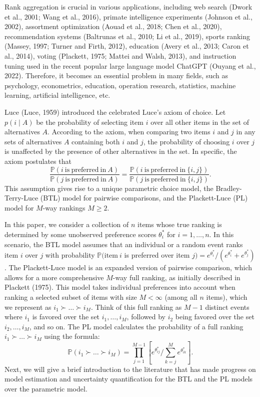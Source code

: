 Rank aggregation is crucial in various applications, including web search (Dwork et al., 2001; Wang et al., 2016), primate intelligence experiments (Johnson et al., 2002), assortment optimization (Aouad et al., 2018; Chen et al., 2020), recommendation systems (Baltrunas et al., 2010; Li et al., 2019), sports ranking (Massey, 1997; Turner and Firth, 2012), education (Avery et al., 2013; Caron et al., 2014), voting (Plackett, 1975; Mattei and Walsh, 2013), and instruction tuning used in the recent popular large language model ChatGPT (Ouyang et al., 2022). Therefore, it becomes an essential problem in many fields, such as psychology, econometrics, education, operation research, statistics, machine learning, artificial intelligence, etc.

Luce (Luce, 1959) introduced the celebrated Luce's axiom of choice. Let \(p(i\mid A)\) be the probability of selecting item \(i\) over all other items in the set of alternatives \(A\). According to the axiom, when comparing two items \(i\) and \(j\) in any sets of alternatives \(A\) containing both \(i\) and \(j\), the probability of choosing \(i\) over \(j\) is unaffected by the presence of other alternatives in the set. In specific, the axiom postulates that
\[
\frac{\mathbb{P}(i\mathrm{~is~preferred~in~}A)}{\mathbb{P}(j\mathrm{~is~preferred~in~}A)} = \frac{\mathbb{P}(i\mathrm{~is~preferred~in~}\{i,j\})}{\mathbb{P}(j\mathrm{~is~preferred~in~}\{i,j\})}.
\]
This assumption gives rise to a unique parametric choice model, the Bradley-Terry-Luce (BTL) model for pairwise comparisons, and the Plackett-Luce (PL) model for \(M\)-way rankings \(M\geq 2\).

In this paper, we consider a collection of \(n\) items whose true ranking is determined by some unobserved preference scores \(\theta_{i}^{*}\) for \(i = 1,\dots ,n\). In this scenario, the BTL model assumes that an individual or a random event ranks item \(i\) over \(j\) with probability \(\mathbb{P}(\mathrm{item}~i\) is preferred over item \(j) = e^{\theta_i^*} / (e^{\theta_i^*} + e^{\theta_j^*})\). The Plackett-Luce model is an expanded version of pairwise comparison, which allows for a more comprehensive \(M\)-way full ranking, as initially described in Plackett (1975). This model takes individual preferences into account when ranking a selected subset of items with size \(M< \infty\) (among all \(n\) items), which we represent as \(i_{1}\succ \dots \succ i_{M}\). Think of this full ranking as \(M - 1\) distinct events where \(i_{1}\) is favored over the set \(i_{1},\ldots ,i_{M}\), followed by \(i_{2}\) being favored over the set \(i_{2},\ldots ,i_{M}\), and so on. The PL model calculates the probability of a full ranking \(i_{1}\succ \dots \succ i_{M}\) using the formula:
\[
\mathbb{P}(i_1\succ \dots \succ i_M) = \prod_{j = 1}^{M - 1}\left[e^{\theta_{ij}^*} / \sum_{k = j}^{M}e^{\theta_{ik}^*}\right].
\]
Next, we will give a brief introduction to the literature that has made progress on model estimation and uncertainty quantification for the BTL and the PL models over the parametric model.

